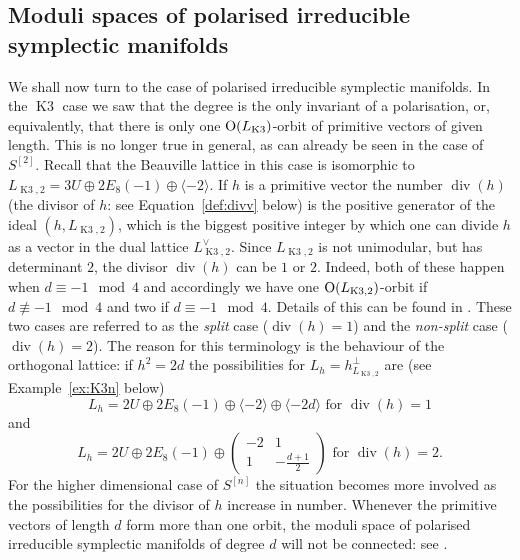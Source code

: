 \documentclass[a4paper,11pt]{article}
\newcommand{\Orth}{\mathop{\null\mathrm {O}}\nolimits}
\newcommand{\latt}[1]{{\langle{#1}\rangle}}
\renewcommand{\div}{\mathop{\mathrm {div}}\nolimits}
\newcommand{\Kthree}{\mathop{\mathrm {K3}}\nolimits}
\begin{document}
\subsection{Moduli spaces of polarised irreducible symplectic manifolds}\label{subsect:modulipolsymp}

We shall now turn to the case of polarised irreducible symplectic
manifolds. In the $\Kthree$ case we saw that the degree is the only
invariant of a polarisation, or, equivalently, that there is only one
$\Orth(L_{\Kthree})$-orbit of primitive vectors of given length.  This
is no longer true in general, as can already be seen in the case of
$S^{[2]}$. Recall that the Beauville lattice in this case is
isomorphic to $L_{\Kthree,2} =3U \oplus 2E_8(-1) \oplus \latt{-2}$.
If $h$ is a primitive vector the number $\div (h)$ (the divisor
of $h$: see Equation~\eqref{def:divv} below) is the positive generator
of the ideal $(h,L_{\Kthree,2})$, which is the biggest positive
integer by which one can divide $h$ as a vector in the dual lattice
$L_{\Kthree,2}^{\vee}$. Since $L_{\Kthree,2}$ is not unimodular, but
has determinant $2$, the divisor $\div(h)$ can be $1$ or $2$. Indeed,
both of these happen when $d \equiv -1 \mod 4$ and accordingly we have
one $\Orth(L_{\Kthree,2})$-orbit if $d \not\equiv -1 \mod 4$ and two
if $d \equiv -1 \mod 4$.  Details of this can be found in
\cite{GHSsymp}.  These two cases are referred to as the \emph{split}
case ($\div(h)=1$) and the \emph{non-split} case ($\div(h)=2$). The
reason for this terminology is the behaviour of the orthogonal
lattice: if $h^2=2d$ the possibilities for
$L_h=h^\perp_{L_{\Kthree,2}}$ are (see Example~\ref{ex:K3n} below)
\begin{equation}\label{splitlattice}
L_h=2U \oplus 2E_8(-1) \oplus \latt{-2} \oplus \latt{-2d}
\mbox{ for } \div(h)=1
\end{equation}
and
\begin{equation}\label{nonsplitlattice}
L_h= 2U \oplus 2E_8(-1) \oplus \begin{pmatrix}
-2 & 1\\
1 &-\frac{d+1}{2}
\end{pmatrix} \mbox{ for } \div(h)=2.
\end{equation}
For the higher dimensional case of $S^{[n]}$ the situation becomes
more involved as the possibilities for the divisor of $h$ increase in
number.  Whenever the primitive vectors of length $d$ form more than
one orbit, the moduli space of polarised irreducible symplectic
manifolds of degree $d$ will not be connected: see \cite{GHSsymp}.
\end{document}

